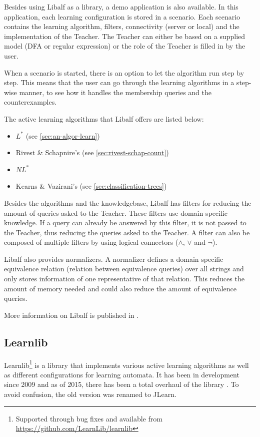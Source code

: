 \documentclass[multi,crop=false,class=article]{standalone}
\begin{document}
Besides using Libalf as a library, a demo application is also available. In 
this application, each learning configuration is stored in a scenario. Each 
scenario contains the learning algorithm, filters, connectivity (server or 
local) and the implementation of the Teacher. The Teacher can either be 
based on a supplied model (DFA or regular expression) or the role of the 
Teacher is filled in by the user. 

When a scenario is started, there is an option to let the algorithm run 
step by step. This means that the user can go through the learning algorithms 
in a step-wise manner, to see how it handles the membership queries and the 
counterexamples. 

The active learning algorithms that Libalf offers are listed below:

\begin{itemize}
	\item $L^*$ (see \cref{sec:an-algor-learn})
	\item Rivest \& Schapnire's (see \cref{sec:rivest-schap-count})
	\item $NL^*$ \cite{Bollig2009}
	\item Kearns \& Vazirani's (see \cref{sec:classification-trees})
\end{itemize}

Besides the algorithms and the knowledgebase, Libalf has filters for reducing 
the amount of queries asked to the Teacher. These filters use domain specific 
knowledge. If a query can already be answered by this filter, it is not passed 
to the Teacher, thus reducing the queries asked to the Teacher. A filter can 
also be composed of multiple filters by using logical connectors ($\land$, 
$\lor$ and $\lnot$).

Libalf also provides normalizers. A normalizer defines a domain specific 
equivalence relation (relation between equivalence queries) over all strings 
and only stores information of one representative of that relation. This 
reduces the amount of memory needed and could also reduce the amount of 
equivalence queries.

More information on Libalf is published in \cite{Bollig2010}.

\subsection{Learnlib}
\label{ssec:learnlib}

Learnlib\footnote{Supported through bug fixes and available from
\url{https://github.com/LearnLib/learnlib}} is a library that implements various
active learning algorithms as well as different configurations for learning
automata. It has been in development since 2009 \cite{Raffelt2009} and as of
2015, there has been a total overhaul of the library \cite{Isberner2015b}. To
avoid confusion, the old version was renamed to JLearn.
\end{document}
